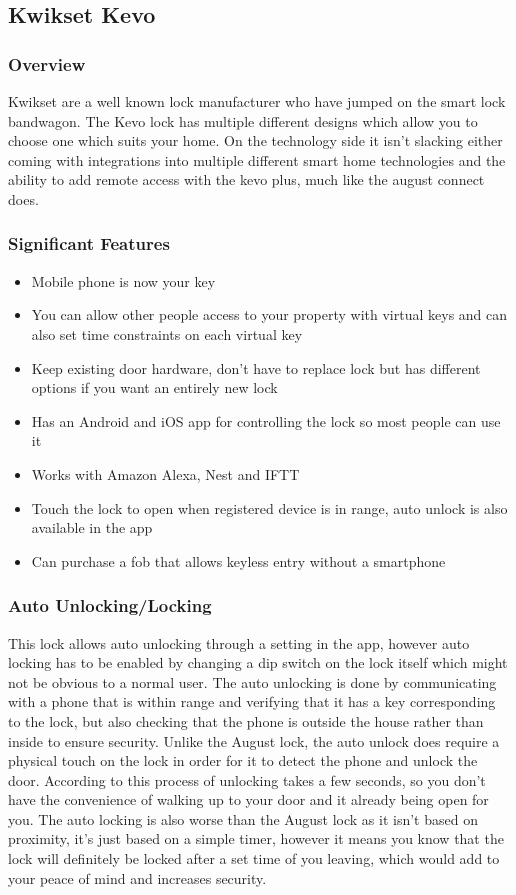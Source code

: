 \subsection{Kwikset Kevo}
\subsubsection*{Overview}
Kwikset are a well known lock manufacturer who have jumped on the smart lock bandwagon. The Kevo lock has multiple different designs which allow you to choose one which suits your home. On the technology side it isn't slacking either coming with integrations into multiple different smart home technologies and the ability to add remote access with the kevo plus, much like the august connect does.

\subsubsection*{Significant Features}
\begin{itemize}
	\item Mobile phone is now your key
	\item You can allow other people access to your property with virtual keys and can also set time constraints on each virtual key
	\item Keep existing door hardware, don't have to replace lock but has different options if you want an entirely new lock
	\item Has an Android and iOS app for controlling the lock so most people can use it
	\item Works with Amazon Alexa, Nest and IFTT
	\item Touch the lock to open when registered device is in range, auto unlock is also available in the app
	\item Can purchase a fob that allows keyless entry without a smartphone
\end{itemize}

\subsubsection*{Auto Unlocking/Locking}
This lock allows auto unlocking through a setting in the app, however auto locking has to be enabled by changing a dip switch on the lock itself which might not be obvious to a normal user. The auto unlocking is done by communicating with a phone that is within range and verifying that it has a key corresponding to the lock, but also checking that the phone is outside the house rather than inside to ensure security. Unlike the August lock, the auto unlock does require a physical touch on the lock in order for it to detect the phone and unlock the door. According to \cite{DeLooper2018} this process of unlocking takes a few seconds, so you don't have the convenience of walking up to your door and it already being open for you. The auto locking is also worse than the August lock as it isn't based on proximity, it's just based on a simple timer, however it means you know that the lock will definitely be locked after a set time of you leaving, which would add to your peace of mind and increases security.

